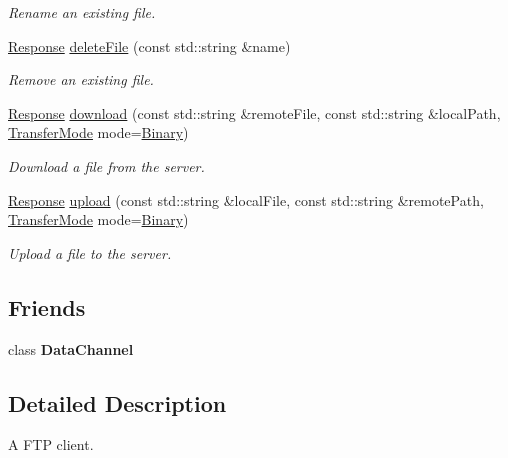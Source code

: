 \begin{DoxyCompactItemize}
\begin{DoxyCompactList}\small\item\em Rename an existing file. \end{DoxyCompactList}\item 
\hyperlink{classsf_1_1Ftp_1_1Response}{Response} \hyperlink{classsf_1_1Ftp_a8aa272b0eb7769a850006e70fcad370f}{delete\-File} (const std\-::string \&name)
\begin{DoxyCompactList}\small\item\em Remove an existing file. \end{DoxyCompactList}\item 
\hyperlink{classsf_1_1Ftp_1_1Response}{Response} \hyperlink{classsf_1_1Ftp_a20c1600ec5fd6f5a2ad1429ab8aa5df4}{download} (const std\-::string \&remote\-File, const std\-::string \&local\-Path, \hyperlink{classsf_1_1Ftp_a1cd6b89ad23253f6d97e6d4ca4d558cb}{Transfer\-Mode} mode=\hyperlink{classsf_1_1Ftp_a1cd6b89ad23253f6d97e6d4ca4d558cba6f253b362639fb5e059dc292762a21ee}{Binary})
\begin{DoxyCompactList}\small\item\em Download a file from the server. \end{DoxyCompactList}\item 
\hyperlink{classsf_1_1Ftp_1_1Response}{Response} \hyperlink{classsf_1_1Ftp_a46d6e15cddd719288b5a08b685e11765}{upload} (const std\-::string \&local\-File, const std\-::string \&remote\-Path, \hyperlink{classsf_1_1Ftp_a1cd6b89ad23253f6d97e6d4ca4d558cb}{Transfer\-Mode} mode=\hyperlink{classsf_1_1Ftp_a1cd6b89ad23253f6d97e6d4ca4d558cba6f253b362639fb5e059dc292762a21ee}{Binary})
\begin{DoxyCompactList}\small\item\em Upload a file to the server. \end{DoxyCompactList}\end{DoxyCompactItemize}
\subsection*{Friends}
\begin{DoxyCompactItemize}
\item 
\hypertarget{classsf_1_1Ftp_a8dee57337b6a7e183bfe21d178757b0c}{class {\bfseries Data\-Channel}}\label{classsf_1_1Ftp_a8dee57337b6a7e183bfe21d178757b0c}

\end{DoxyCompactItemize}


\subsection{Detailed Description}
A F\-T\-P client. 

